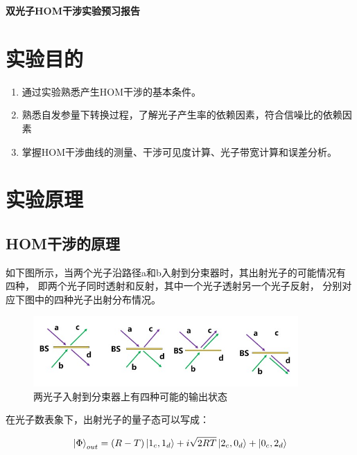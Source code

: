 \documentclass[a4paper,UTF8]{ctexart}
\begin{document}
\begin{center}
    \textbf{\Large 双光子HOM干涉实验预习报告}
    \par {}
\end{center}

\section{实验目的}

\begin{enumerate}
    \item 通过实验熟悉产生HOM干涉的基本条件。
    \item 熟悉自发参量下转换过程，了解光子产生率的依赖因素，符合信噪比的依赖因素
    \item 掌握HOM干涉曲线的测量、干涉可见度计算、光子带宽计算和误差分析。
\end{enumerate}

\section{实验原理}

\subsection{HOM干涉的原理}

如下图所示，当两个光子沿路径a和b入射到分束器时，其出射光子的可能情况有四种，
即两个光子同时透射和反射，其中一个光子透射另一个光子反射，
分别对应下图中的四种光子出射分布情况。

\begin{figure}[H]
    \centering
    \begin{minipage}[b]{0.9\textwidth}
        \centering
        \includegraphics[width=0.9\textwidth]{./fig2.jpg}
        \caption{两光子入射到分束器上有四种可能的输出状态}
    \end{minipage}
\end{figure}

在光子数表象下，出射光子的量子态可以写成：

\begin{equation}
    \ket{\Phi}_{out} = (R-T) \ket{1_c,1_d} + i\sqrt{2RT}\ket{2_c,0_d} + \ket{0_c,2_d}
\end{equation}
\end{document}
